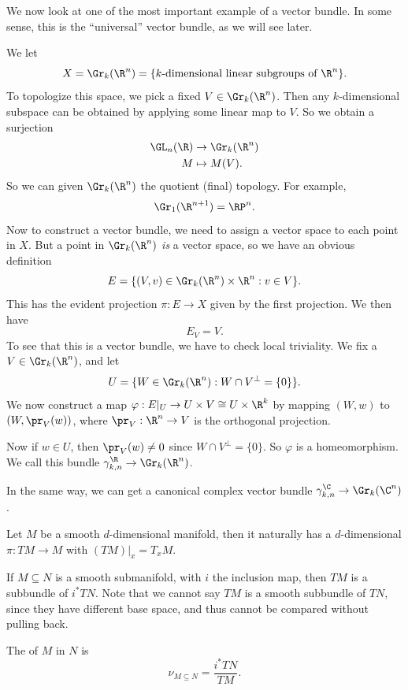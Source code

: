 \documentclass[a4paper]{article}
\theoremstyle{definition}
\begin{document}
We now look at one of the most important example of a vector bundle. In some sense, this is the ``universal'' vector bundle, as we will see later.
\begin{eg}
  We let
  \[
    X = \Gr_k(\R^n) = \{k\text{-dimensional linear subgroups of $\R^n$}\}.
  \]
  To topologize this space, we pick a fixed $V \in \Gr_k(\R^n)$. Then any $k$-dimensional subspace can be obtained by applying some linear map to $V$. So we obtain a surjection
  \begin{align*}
    \GL_n(\R) &\to \Gr_k(\R^n)\\
    M &\mapsto M(V).
  \end{align*}
  So we can given $\Gr_k(\R^n)$ the quotient (final) topology. For example,
  \[
    \Gr_1(\R^{n + 1}) = \RP^n.
  \]
  Now to construct a vector bundle, we need to assign a vector space to each point in $X$. But a point in $\Gr_k(\R^n)$ \emph{is} a vector space, so we have an obvious definition
  \[
    E = \{(V, v) \in \Gr_k(\R^n) \times \R^n: v \in V\}.
  \]
  This has the evident projection $\pi: E \to X$ given by the first projection. We then have
  \[
    E_V = V.
  \]
  To see that this is a vector bundle, we have to check local triviality. We fix a $V \in \Gr_k(\R^n)$, and let
  \[
    U = \{W \in\Gr_k(\R^n): W \cap V^\perp = \{0\}\}.
  \]
  We now construct a map $\varphi: E|_U \to U \times V \cong U \times \R^k$ by mapping $(W, w)$ to $(W, \pr_V(w))$, where $\pr_V: \R^n \to V$ is the orthogonal projection.

  Now if $w \in U$, then $\pr_V(w) \not= 0$ since $W \cap V^\perp = \{0\}$. So $\varphi$ is a homeomorphism. We call this bundle $\gamma_{k, n}^\R \to \Gr_k(\R^n)$.

  In the same way, we can get a canonical complex vector bundle $\gamma_{k, n}^\C \to \Gr_k(\C^n)$.
\end{eg}


\begin{eg}
  Let $M$ be a smooth $d$-dimensional manifold, then it naturally has a $d$-dimensional  $\pi: TM \to M$ with $(TM)|_x = T_x M$.

  If $M \subseteq N$ is a smooth submanifold, with $i$ the inclusion map, then $TM$ is a subbundle of $i^* TN$. Note that we cannot say $TM$ is a smooth subbundle of $TN$, since they have different base space, and thus cannot be compared without pulling back.

  The  of $M$ in $N$ is
  \[
    \nu_{M \subseteq N} = \frac{i^* TN}{TM}.
  \]
\end{eg}
\end{document}

